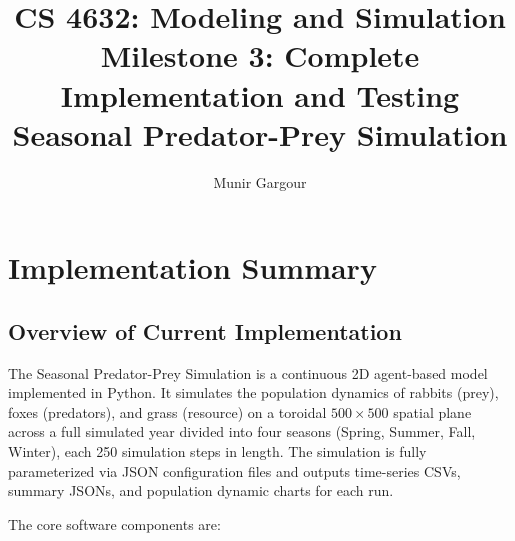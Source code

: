 \documentclass[12pt]{article}
\title{
    \textbf{CS 4632: Modeling and Simulation}\\
    \large Milestone 3: Complete Implementation and Testing\\[0.5em]
    \normalsize Seasonal Predator-Prey Simulation
}
\author{Munir Gargour}
\date{}
\begin{document}
\maketitle
\thispagestyle{fancy}
\tableofcontents
\newpage

\section{Implementation Summary}

\subsection{Overview of Current Implementation}

The Seasonal Predator-Prey Simulation is a continuous 2D agent-based model
implemented in Python. It simulates the population dynamics of rabbits (prey),
foxes (predators), and grass (resource) on a toroidal $500 \times 500$ spatial
plane across a full simulated year divided into four seasons (Spring, Summer,
Fall, Winter), each 250 simulation steps in length. The simulation is fully
parameterized via JSON configuration files and outputs time-series CSVs,
summary JSONs, and population dynamic charts for each run.

The core software components are:
\end{document}
